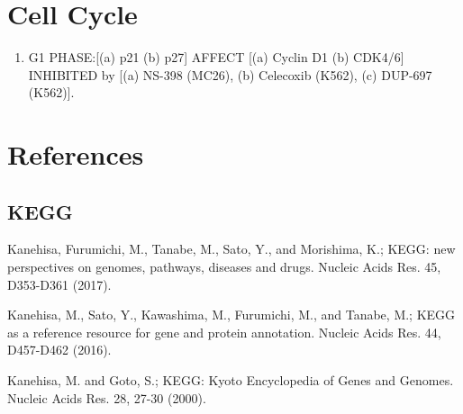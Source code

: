 

\section{Cell Cycle}

\begin{enumerate}
	\item G1 PHASE:[(a) p21 (b) p27] AFFECT [(a) Cyclin D1 (b) CDK4/6] INHIBITED by [(a) NS-398 (MC26), (b) Celecoxib (K562), (c) DUP-697 (K562)]. \cite{key4000}
\end{enumerate}


\section{References}


\subsection{KEGG}

 Kanehisa, Furumichi, M., Tanabe, M., Sato, Y., and Morishima, K.; 
\newblock KEGG: new perspectives on genomes, pathways, diseases and drugs. 
\newblock Nucleic Acids Res. 45, D353-D361 (2017).

 Kanehisa, M., Sato, Y., Kawashima, M., Furumichi, M., and Tanabe, M.; 
\newblock KEGG as a reference resource for gene and protein annotation. 
\newblock Nucleic Acids Res. 44, D457-D462 (2016).

 Kanehisa, M. and Goto, S.; 
\newblock KEGG: Kyoto Encyclopedia of Genes and Genomes. 
\newblock Nucleic Acids Res. 28, 27-30 (2000). 
